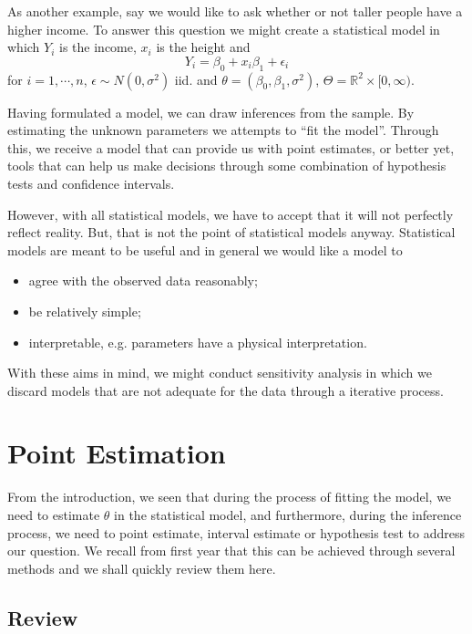\documentclass[
]{article}
\theoremstyle{definition}
\theoremstyle{definition}
\begin{document}
As another example, say we would like to ask whether or not taller
people have a higher income. To answer this question we might create a
statistical model in which \(Y_i\) is the income, \(x_i\) is the height
and \[Y_i = \beta_0 + x_i \beta_1 + \epsilon_i\] for
\(i = 1, \cdots, n\), \(\epsilon \sim N(0, \sigma^2)\) iid. and
\(\theta = (\beta_0, \beta_1, \sigma^2)\),
\(\Theta = \mathbb{R}^2 \times [0, \infty)\).

Having formulated a model, we can draw inferences from the sample. By
estimating the unknown parameters we attempts to ``fit the model''.
Through this, we receive a model that can provide us with point
estimates, or better yet, tools that can help us make decisions through
some combination of hypothesis tests and confidence intervals.

However, with all statistical models, we have to accept that it will not
perfectly reflect reality. But, that is not the point of statistical
models anyway. Statistical models are meant to be useful and in general
we would like a model to

\begin{itemize}
  \item agree with the observed data reasonably;
  \item be relatively simple;
  \item interpretable, e.g. parameters have a physical interpretation.
\end{itemize}

With these aims in mind, we might conduct sensitivity analysis in which
we discard models that are not adequate for the data through a iterative
process.

\newpage

\hypertarget{point-estimation}{%
\section{Point Estimation}\label{point-estimation}}

From the introduction, we seen that during the process of fitting the
model, we need to estimate \(\theta\) in the statistical model, and
furthermore, during the inference process, we need to point estimate,
interval estimate or hypothesis test to address our question. We recall
from first year that this can be achieved through several methods and we
shall quickly review them here.

\hypertarget{review}{%
\subsection{Review}\label{review}}
\end{document}
